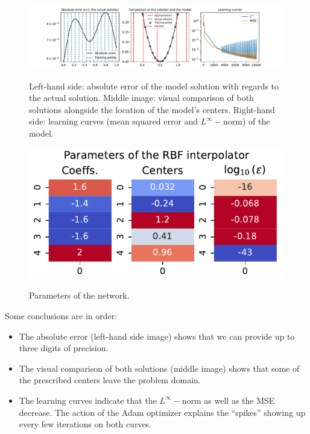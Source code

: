 \documentclass[12pt]{report} %
\begin{document}
\begin{figure}[ht]
  \hspace*{-2cm}
  {\includegraphics[width=1.25\textwidth, trim={2cm 0 2.5cm 0}, clip=true]
  {imagenes/experiments/1d/ode/ode_report.pdf}}
  \caption{Left-hand side: absolute error of the model solution with regards to the actual
  solution. Middle image: visual comparison of both solutions alongside the location of the 
  model's centers.
  Right-hand side: learning curves (mean squared error and $L^\infty-$norm) of the model.}
  \label{fig:solution-ode-1d}
\end{figure}

\begin{figure}
  \caption{Parameters of the network.\label{fig-parameters-ode-1d}}
  {\includegraphics[width=\textwidth]{imagenes/experiments/1d/ode/parameters_of_rbf_interpolator.pdf}}
  \end{figure} 

Some conclusions are in order:
\begin{itemize}
  \item The absolute error (left-hand side image) shows that we can provide up to three digits
  of precision.
  \item The visual comparison of both solutions (middle image) shows that 
  some of the prescribed centers leave the problem domain.
  \item The learning curves indicate that the $L^\infty-$norm as well as the MSE decrease.
  The action of the Adam optimizer explains the ``spikes'' showing up every few iterations
  on both curves.
\end{itemize}
\end{document}

